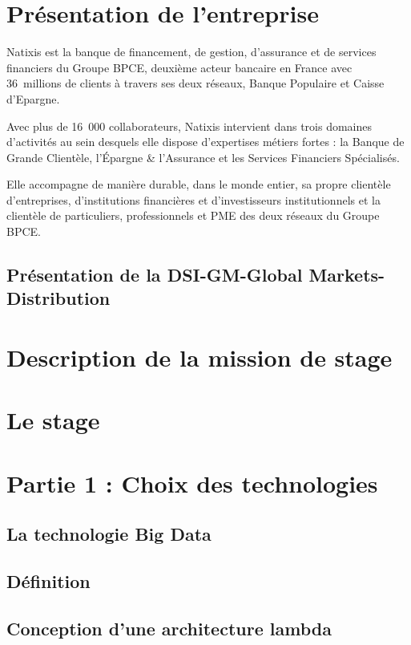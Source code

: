 \section{ Présentation de l'entreprise}

Natixis est la banque de financement, de gestion, d’assurance et de services financiers du Groupe BPCE, deuxième acteur bancaire en France avec 36 millions de clients à travers ses deux réseaux, Banque Populaire et Caisse d’Epargne.

Avec plus de 16 000 collaborateurs, Natixis intervient dans trois domaines d’activités au sein desquels elle dispose d’expertises métiers fortes : la Banque de Grande Clientèle, l’Épargne & l’Assurance et les Services Financiers Spécialisés.

Elle accompagne de manière durable, dans le monde entier, sa propre clientèle d’entreprises, d'institutions financières et d'investisseurs institutionnels et la clientèle de particuliers, professionnels et PME des deux réseaux du Groupe BPCE. 
\subsection{Présentation de la  DSI-GM-Global Markets-Distribution}
\section {Description de la mission de stage}
\section {Le stage }
\section{Partie 1 : Choix des technologies}
\subsection{La technologie Big Data}
\subsection {Définition}
\subsection{Conception d'une architecture lambda}
 
